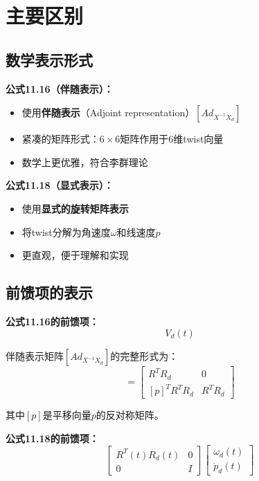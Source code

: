 \documentclass[12pt,a4paper]{article}
\begin{document}
\section{主要区别}

\subsection{数学表示形式}

\textbf{公式11.16（伴随表示）：}
\begin{itemize}
\item 使用\textbf{伴随表示}（Adjoint representation）$[Ad_{X^{-1}X_d}]$
\item 紧凑的矩阵形式：$6 \times 6$矩阵作用于6维twist向量
\item 数学上更优雅，符合李群理论
\end{itemize}

\textbf{公式11.18（显式表示）：}
\begin{itemize}
\item 使用\textbf{显式的旋转矩阵表示}
\item 将twist分解为角速度$\omega$和线速度$\dot{p}$
\item 更直观，便于理解和实现
\end{itemize}

\subsection{前馈项的表示}

\textbf{公式11.16的前馈项：}
\begin{equation}
[Ad_{X^{-1}X_d}] V_d(t)
\end{equation}

伴随表示矩阵$[Ad_{X^{-1}X_d}]$的完整形式为：
\begin{equation}
[Ad_{X^{-1}X_d}] = \begin{bmatrix}
R^T R_d & 0 \\
[p]^T R^T R_d & R^T R_d
\end{bmatrix}
\end{equation}

其中$[p]$是平移向量$p$的反对称矩阵。

\textbf{公式11.18的前馈项：}
\begin{equation}
\begin{bmatrix}
R^T(t)R_d(t) & 0 \\
0 & I
\end{bmatrix}
\begin{bmatrix}
\omega_d(t) \\
\dot{p}_d(t)
\end{bmatrix}
\end{equation}
\end{document}
